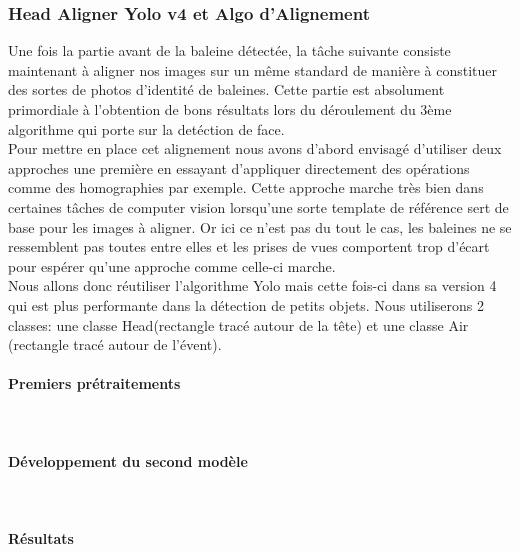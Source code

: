 \documentclass[12pt,a4paper]{report}
\begin{document}
\begin{spacing}{1.5}
\newpage
\subsubsection{Head Aligner Yolo v4 et Algo d'Alignement}
Une fois la partie avant de la baleine détectée, la tâche suivante consiste maintenant à aligner nos images sur un même standard de manière à constituer des sortes de photos d'identité de baleines. Cette partie est absolument primordiale à l'obtention de bons résultats lors du déroulement du 3ème algorithme qui porte sur la detéction de face. 
\\
Pour mettre en place cet alignement nous avons d’abord envisagé d’utiliser deux approches une première en essayant d’appliquer directement des opérations comme des homographies par exemple. Cette approche marche très bien dans certaines tâches de computer vision lorsqu’une sorte template de référence sert de base pour les images à aligner. Or ici ce n’est pas du tout le cas, les baleines ne se ressemblent pas toutes entre elles et les prises de vues comportent trop d’écart pour espérer qu’une approche comme celle-ci marche. 
\\Nous allons donc réutiliser l’algorithme Yolo mais cette fois-ci dans sa version 4 qui est plus performante dans la détection de petits objets. Nous utiliserons 2 classes: une classe Head(rectangle tracé autour de la tête) et une classe Air (rectangle tracé autour de l’évent).

\paragraph{Premiers prétraitements} \mbox{}\\


\paragraph{Développement du second modèle}\mbox{}\\

\paragraph{Résultats}\mbox{}\\



\end{spacing}
\end{document}
